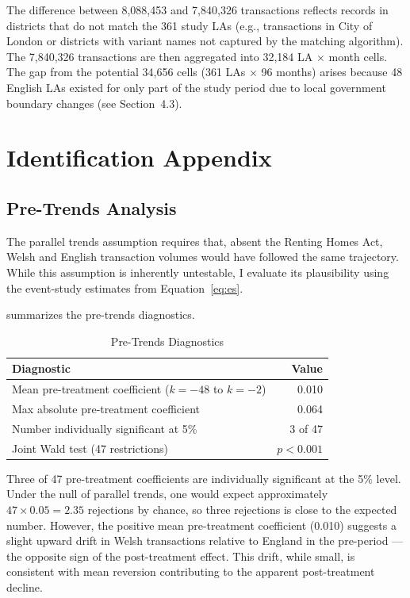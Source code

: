\documentclass[12pt]{article}
\begin{document}
The difference between 8,088,453 and 7,840,326 transactions reflects records in districts that do not match the 361 study LAs (e.g., transactions in City of London or districts with variant names not captured by the matching algorithm). The 7,840,326 transactions are then aggregated into 32,184 LA $\times$ month cells. The gap from the potential 34,656 cells (361 LAs $\times$ 96 months) arises because 48 English LAs existed for only part of the study period due to local government boundary changes (see Section~4.3).

\section{Identification Appendix}
\label{app:identification}

\subsection{Pre-Trends Analysis}

The parallel trends assumption requires that, absent the Renting Homes Act, Welsh and English transaction volumes would have followed the same trajectory. While this assumption is inherently untestable, I evaluate its plausibility using the event-study estimates from Equation~\ref{eq:es}.

 summarizes the pre-trends diagnostics.

\begin{table}[H]
\centering
\caption{Pre-Trends Diagnostics}
\label{tab:pretrends}
\begin{tabular}{lr}
\toprule
Diagnostic & Value \\
\midrule
Mean pre-treatment coefficient ($k = -48$ to $k = -2$) & 0.010 \\
Max absolute pre-treatment coefficient & 0.064 \\
Number individually significant at 5\% & 3 of 47 \\
Joint Wald test (47 restrictions) & $p < 0.001$ \\
\bottomrule
\end{tabular}
\end{table}

Three of 47 pre-treatment coefficients are individually significant at the 5\% level. Under the null of parallel trends, one would expect approximately $47 \times 0.05 = 2.35$ rejections by chance, so three rejections is close to the expected number. However, the positive mean pre-treatment coefficient (0.010) suggests a slight upward drift in Welsh transactions relative to England in the pre-period --- the opposite sign of the post-treatment effect. This drift, while small, is consistent with mean reversion contributing to the apparent post-treatment decline.
\end{document}
